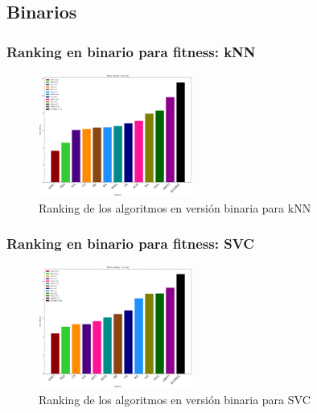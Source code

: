 \subsection{Binarios}
\begin{frame}
    \frametitle{Ranking en binario para fitness: kNN}
    \begin{figure}
        \begin{center}
            \includegraphics[width=0.45\textwidth]{imagenes/chapter5/rankings_knn_avg_bin.png}
        \end{center}
        \caption{Ranking de los algoritmos en versión binaria para kNN}
    \end{figure}
\end{frame}
\begin{frame}
    \frametitle{Ranking en binario para fitness: SVC}
    \begin{figure}
        \begin{center}
            \includegraphics[width=0.45\textwidth]{imagenes/chapter5/rankings_svc_avg_bin.png}
        \end{center}
        \caption{Ranking de los algoritmos en versión binaria para SVC}
    \end{figure}
\end{frame}

